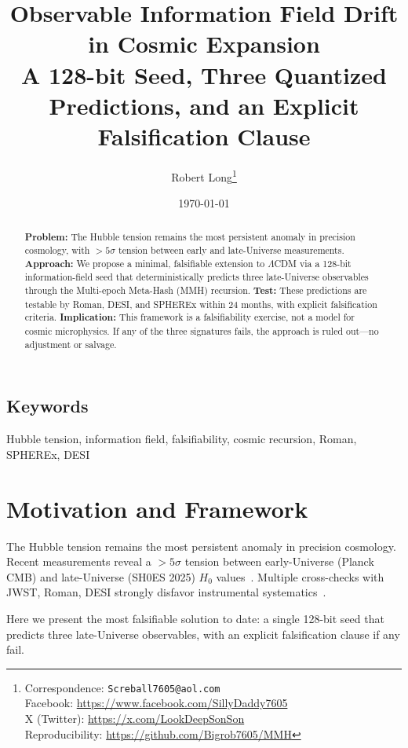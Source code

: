 \documentclass[11pt,a4paper]{article}
\title{
  \bfseries Observable Information Field Drift in Cosmic Expansion\\[4pt]
  \large A 128-bit Seed, Three Quantized Predictions, and an Explicit Falsification Clause
}
\author{
  Robert Long\thanks{
    Correspondence: \texttt{Screball7605@aol.com} \\
    Facebook: \url{https://www.facebook.com/SillyDaddy7605} \\
    X (Twitter): \url{https://x.com/LookDeepSonSon} \\
    Reproducibility: \url{https://github.com/Bigrob7605/MMH}
  }
}
\date{\today}
\begin{document}
\begin{titlepage}
\thispagestyle{empty}
\maketitle

\vspace{-1.5em}

\begin{abstract}
\textbf{Problem:} The Hubble tension remains the most persistent anomaly in precision cosmology, with $>5\sigma$ tension between early and late-Universe measurements. \textbf{Approach:} We propose a minimal, falsifiable extension to $\Lambda$CDM via a 128-bit information-field seed that deterministically predicts three late-Universe observables through the Multi-epoch Meta-Hash (MMH) recursion. \textbf{Test:} These predictions are testable by Roman, DESI, and SPHEREx within 24 months, with explicit falsification criteria. \textbf{Implication:} This framework is a falsifiability exercise, not a model for cosmic microphysics. If any of the three signatures fails, the approach is ruled out—no adjustment or salvage.
\end{abstract}

\vspace{0.5em}
\section*{Keywords}
Hubble tension, information field, falsifiability, cosmic recursion, Roman, SPHEREx, DESI

\end{titlepage}

\setcounter{page}{1}

\FloatBarrier
\section{Motivation and Framework}
The Hubble tension remains the most persistent anomaly in precision cosmology. Recent measurements reveal a $>5\sigma$ tension between early-Universe (Planck CMB) and late-Universe (SH0ES 2025) $H_0$ values~\cite{Riess2024}. Multiple cross-checks with JWST, Roman, DESI strongly disfavor instrumental systematics~\cite{DESI2025,TRGB2025}. 

Here we present the most falsifiable solution to date: a single 128-bit seed that predicts three late-Universe observables, with an explicit falsification clause if any fail.
\end{document}
